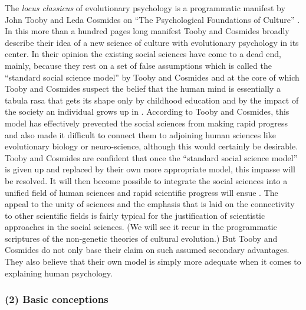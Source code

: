 The {\em locus classicus}
of evolutionary psychology is a programmatic manifest by John Tooby and Leda
Cosmides on ``The Psychological Foundations of Culture''
\cite[]{tooby-cosmides:1992}. In this more than a hundred pages long manifest
Tooby and Cosmides broadly describe their idea of a new science of culture
with evolutionary psychology in its center. In their opinion the existing
social sciences have come to a dead end, mainly, because they rest on a set of false
assumptions which is called the ``standard social science model'' by Tooby and
Cosmides and at the core of which Tooby and Cosmides suspect the belief that
the human mind is essentially a tabula rasa that gets its shape only by
childhood education and by the impact of the society an individual grows up in
\cite[p.\ 24ff.]{tooby-cosmides:1992}. According to Tooby and Cosmides, this
model has effectively prevented the social sciences from making rapid progress
and also made it difficult to connect them to adjoining human sciences like
evolutionary biology or neuro-science, although this would certainly be
desirable. Tooby and Cosmides are confident that once the ``standard social
science model'' is given up and replaced by their own more appropriate
model, this impasse will be resolved. It will then become possible to
integrate the social sciences into a unified field of human sciences and rapid
scientific progress will ensue \cite[p.\ 19ff.]{tooby-cosmides:1992}. The
appeal to the unity of sciences and the emphasis that is laid on the
connectivity to other scientific fields is fairly typical for the justification
of scientistic approaches in the social sciences. (We will see it recur in the
programmatic scriptures of the non-genetic theories of cultural evolution.) But
Tooby and Cosmides do not only base their claim on such assumed secondary
advantages. They also believe that their own model is simply more adequate when
it comes to explaining human psychology.

\subsubsection{(2) Basic conceptions} 

